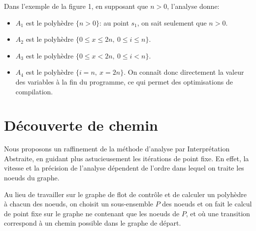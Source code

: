 \documentclass{llncs}
\begin{document}
Dans l'exemple de la figure 1, en supposant que $n>0$, l'analyse donne:
\begin{itemize}
\item $A_1$ est le polyhèdre $\{n>0\}$: au point $s_1$, on sait
seulement que $n>0$.
\item $A_2$ est le polyhèdre $\{0 \leq x \leq 2n,\ 0 \leq i \leq n\}$.
\item $A_3$ est le polyhèdre $\{0 \leq x < 2n,\ 0 \leq i < n\}$.
\item $A_4$ est le polyhèdre $\{i=n,\ x=2n\}$. On connaît donc directement la
valeur des variables à la fin du programme, ce qui permet des optimisations de
compilation.
\end{itemize}

\section{Découverte de chemin}

Nous proposons un raffinement de la méthode d'analyse par Interprétation
Abstraite, en guidant plus astucieusement les itérations de point fixe. En
effet, la vitesse et la précision de l'analyse dépendent de l'ordre dans lequel on
traite les noeuds du graphe.

Au lieu de travailler sur le graphe de flot de contrôle et de calculer un
polyhèdre à chacun des noeuds, on choisit un sous-ensemble $P$ des noeuds et on fait
le calcul de point fixe sur le graphe ne contenant que les noeuds de $P$, et où
une transition correspond à un chemin possible dans le graphe de départ.
\end{document}
